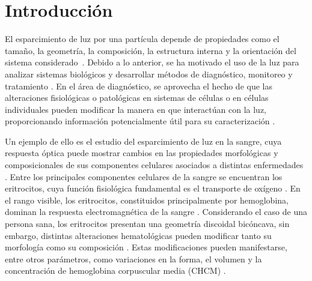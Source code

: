 
\chapter*{Introducción}
\label{chapter:intro}


%
%

El esparcimiento de luz por una partícula depende de propiedades como el tamaño, la geometría, la composición, la estructura interna y la orientación del sistema considerado~\cite{baldiniShiningLightFuture2025}. Debido a lo anterior, se ha motivado  el uso de la luz para analizar sistemas biológicos y desarrollar métodos de diagnóstico, monitoreo y tratamiento \cite{baldiniShiningLightFuture2025}. En el área de diagnóstico, se aprovecha el hecho de que las alteraciones fisiológicas o patológicas en sistemas de células o en células individuales pueden modificar la manera en que interactúan con la luz, proporcionando información potencialmente útil para su caracterización \cite{baldiniShiningLightFuture2025}. %
%

Un ejemplo de ello es el estudio del esparcimiento de luz en la sangre, cuya respuesta óptica puede mostrar cambios en las propiedades morfológicas y composicionales de sus componentes celulares asociados a distintas enfermedades \cite{ergulComputationalStudyScattering2010}. Entre los principales componentes celulares de la sangre se encuentran los eritrocitos, cuya función fisiológica fundamental es el transporte de oxígeno \cite{palTextbookMedicalPhysiology2021}. En el rango visible, los eritrocitos, constituidos principalmente por hemoglobina,  dominan la respuesta electromagnética de la sangre \cite{bosschaartLiteratureReviewNovel2014}. Considerando el caso de una persona sana, los eritrocitos presentan una geometría discoidal bicóncava, sin embargo, distintas alteraciones hematológicas pueden modificar tanto su morfología como su composición \cite{palTextbookMedicalPhysiology2021}. Estas modificaciones pueden manifestarse, entre otros parámetros, como variaciones en la forma, el volumen y la concentración de hemoglobina corpuscular media (CHCM) \cite{palTextbookMedicalPhysiology2021}.
%
%

